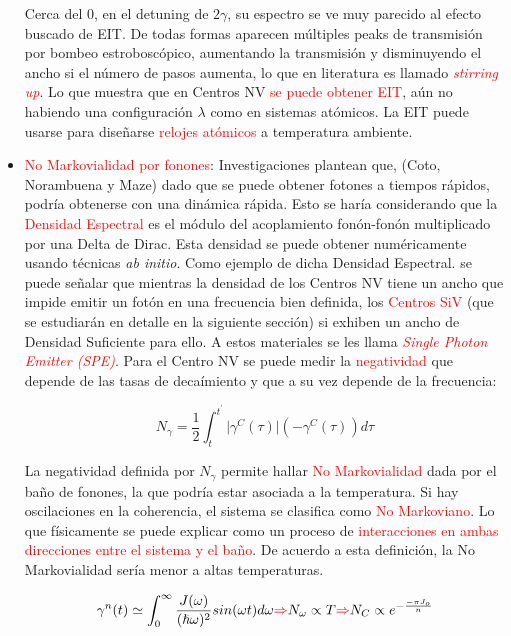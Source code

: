 \documentclass{book}
\begin{document}
\begin{itemize}
    Cerca del 0, en el detuning de $2\gamma$, su espectro se ve muy parecido al efecto buscado de EIT. De todas formas aparecen múltiples peaks de transmisión por bombeo estroboscópico, aumentando la transmisión y disminuyendo el ancho si el número de pasos aumenta, lo que en literatura es llamado \textcolor{red}{\textit{stirring up}}. Lo que muestra que en Centros NV \textcolor{red}{se puede obtener EIT}, aún no habiendo una configuración $\lambda$ como en sistemas atómicos. La EIT puede usarse para diseñarse \textcolor{red}{relojes atómicos} a temperatura ambiente. 
    \item \textcolor{red}{No Markovialidad por fonones}:
    Investigaciones plantean que, (Coto, Norambuena y Maze) dado que se puede obtener fotones a tiempos rápidos, podría obtenerse con una dinámica rápida. Esto se haría considerando que la \textcolor{red}{Densidad Espectral} es el módulo del acoplamiento fonón-fonón multiplicado por una Delta de Dirac. Esta densidad se puede obtener numéricamente usando técnicas \textit{ab initio}. Como ejemplo de dicha Densidad Espectral. se puede señalar que mientras la densidad de los Centros NV tiene un ancho que impide emitir un fotón en una frecuencia bien definida, los \textcolor{red}{Centros SiV} (que se estudiarán en detalle en la siguiente sección) si exhiben un ancho de Densidad Suficiente para ello. A estos materiales se les llama \textcolor{red}{\textit{Single Photon Emitter (SPE)}}. Para el Centro NV se puede medir la \textcolor{red}{negatividad} que depende de las tasas de decaímiento y que a su vez depende de la frecuencia:
    
    \begin{equation}\label{eq8.16} N_\gamma=\frac{1}{2} \int_t^{t^\prime} \lvert\gamma^C(\tau)\rvert(-\gamma^C(\tau))d\tau\end{equation}
    
    La negatividad definida por $N_\gamma$ permite hallar \textcolor{red}{No Markovialidad} dada por el baño de fonones, la que podría estar asociada a la temperatura. Si hay oscilaciones en la coherencia, el sistema se clasifica como  \textcolor{red}{No Markoviano}. Lo que físicamente se puede explicar como un proceso de \textcolor{red}{interacciones en ambas direcciones entre el sistema y el baño}. De acuerdo a esta definición, la No Markovialidad sería menor a altas temperaturas.
    
    \begin{equation}\label{eq8.17}\gamma^n(t)\simeq \int_0^\infty \frac{J(\omega)}{(\hslash\omega)^2}sin(\omega t)d\omega \textcolor{red}{\Rightarrow} N_\omega \propto T \textcolor{red}{\Rightarrow} N_C\propto e^{-\frac{-\pi J_o}{n}}\end{equation}
    

\end{itemize}
\end{document}
